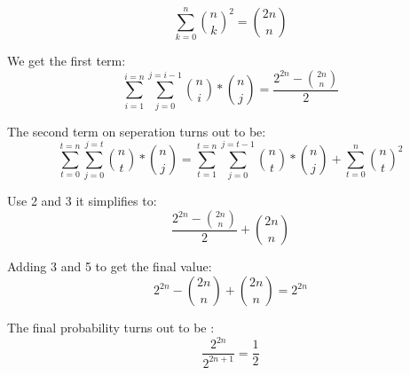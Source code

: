 \documentclass[12pt]{article}
\begin{document}
\begin{equation*}
\sum_{k=0}^n \binom{n}{k}^2 = \binom{2n}{n}
\end{equation*}

We get the first term:
\begin{equation}
    \sum_{i=1}^{i=n}\sum_{j=0}^{j=i-1}\binom{n}{i}*\binom{n}{j} = \frac{2^{2n}-\binom{2n}{n}}{2}
\end{equation}

The second term on seperation turns out to be:
\begin{equation}
    \sum_{t=0}^{t=n}\sum_{j=0}^{j=t}\binom{n}{t}*\binom{n}{j} = \sum_{t=1}^{t=n}\sum_{j=0}^{j=t-1}\binom{n}{t}*\binom{n}{j} + \sum_{t=0}^n \binom{n}{t}^2  
\end{equation}

Use 2 and 3 it simplifies to:
\begin{equation}
    \frac{2^{2n}-\binom{2n}{n}}{2} + \binom{2n}{n} 
\end{equation}

Adding 3 and 5 to get the final value:
\begin{equation}
    2^{2n} - \binom{2n}{n} + \binom{2n}{n} = 2^{2n} 
\end{equation}

The final probability turns out to be :
\begin{equation}
    \frac{2^{2n}}{2^{2n+1}} = \frac{1}{2}
\end{equation}

\newpage
\end{document}
